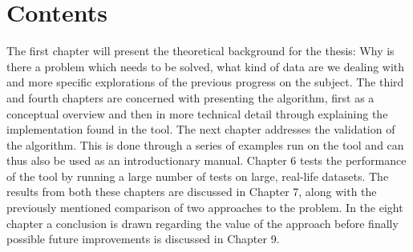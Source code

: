 \documentclass[thesis.tex]{subfiles}
\begin{document}
\section{Contents}
The first chapter will present the theoretical background for the thesis: Why is there a problem which needs to be solved, what kind of data are we dealing with and more specific explorations of the previous progress on the subject. The third and fourth chapters are concerned with presenting the algorithm, first as a conceptual overview and then in more technical detail through explaining the implementation found in the tool. The next chapter addresses the validation of the algorithm. This is done through a series of examples run on the tool and can thus also be used as an introductionary manual. Chapter 6 tests the performance of the tool by running a large number of tests on large, real-life datasets. The results from both these chapters are discussed in Chapter 7, along with the previously mentioned comparison of two approaches to the problem. In the eight chapter a conclusion is drawn regarding the value of the approach before finally possible future improvements is discussed in Chapter 9.
\end{document}
